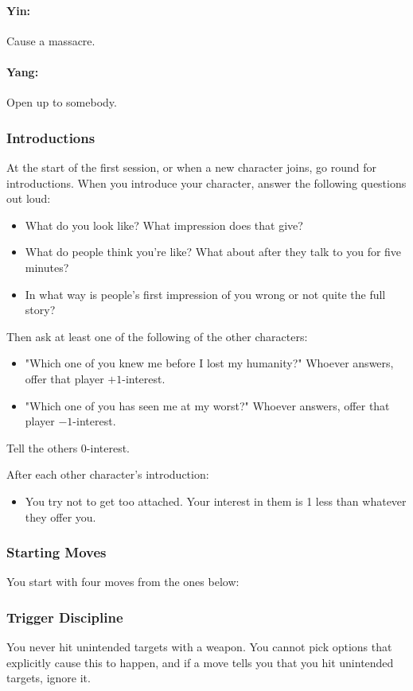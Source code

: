 \paragraph{Yin:} Cause a massacre.
\paragraph{Yang:} Open up to somebody.

\subsubsection{Introductions}
At the start of the first session, or when a new character joins, go round for introductions.
When you introduce your character, answer the following questions out loud:
\begin{itemize}
\item What do you look like? What impression does that give?
\item What do people think you're like? What about after they talk to you for five minutes?
\item In what way is people's first impression of you wrong or not quite the full story?
\end{itemize}

Then ask at least one of the following of the other characters:
\begin{itemize}
\item "Which one of you knew me before I lost my humanity?" Whoever answers, offer that player $+1$-interest.
\item "Which one of you has seen me at my worst?" Whoever answers, offer that player $-1$-interest.
\end{itemize}
Tell the others 0-interest.

After each other character's introduction:
\begin{itemize}
\item You try not to get too attached. Your interest in them is 1 less than whatever they offer you.
\end{itemize}

\subsubsection{Starting Moves}
You start with four moves from the ones below:

\subsubsection{Trigger Discipline} You never hit unintended targets with a weapon. You cannot pick options that explicitly cause this to happen, and if a move tells you that you hit unintended targets, ignore it.

